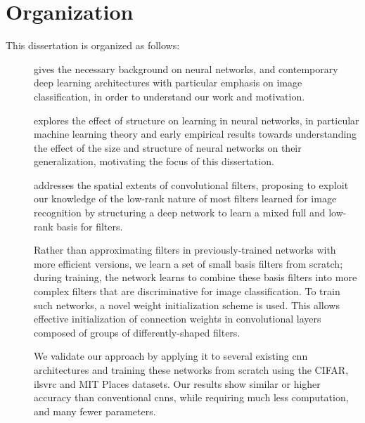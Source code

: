 \documentclass[thesis]{subfiles}
\begin{document}
\section{Organization}
This dissertation is organized as follows:
\begin{description}
	\item[] gives the necessary background on neural networks, and contemporary deep learning architectures
	with particular emphasis on image classification, in order to understand our work and motivation.
	
	\item[] explores the effect of structure on learning in neural networks, in particular machine learning theory and early empirical results towards understanding the effect of the size and structure of neural networks on their generalization, motivating the focus of this dissertation.
	
	\item[] addresses the spatial extents of convolutional filters, proposing to exploit our knowledge of the low-rank nature of most filters learned for image recognition by structuring a deep network to learn a mixed full and low-rank basis for filters.
	
	Rather than approximating filters in previously-trained networks with more efficient versions, we learn a set of small basis filters from scratch; during training, the network learns to combine these basis filters into more complex filters that are discriminative for image classification. To train such networks, a novel weight initialization scheme is used. This allows effective initialization of connection weights in convolutional layers composed of groups of differently-shaped filters. 
	
	We validate our approach by applying it to several existing \gls{cnn} architectures and training these networks from scratch using the CIFAR, \gls{ilsvrc} and MIT Places datasets. Our results show similar or higher accuracy than conventional \glspl{cnn}, while requiring much less computation, and many fewer parameters. %
	

\end{description}
\end{document}
